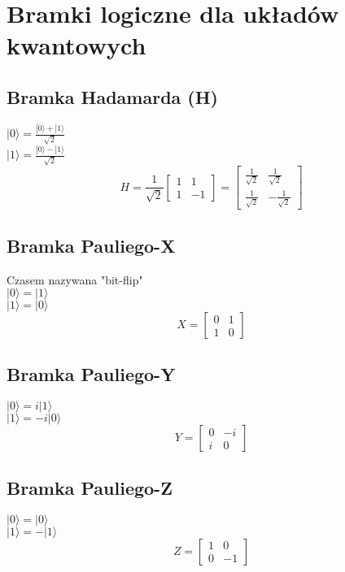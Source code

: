 \documentclass[12pt]{article}
\begin{document}
\newpage

\section{Bramki logiczne dla układów kwantowych}

\subsection{Bramka Hadamarda (H)}
$|0\rangle = \frac{|0\rangle + |1\rangle}{\sqrt{2}}$ \\
$|1\rangle = \frac{|0\rangle - |1\rangle}{\sqrt{2}}$
\[H = \frac{1}{\sqrt{2}}
\begin{bmatrix}
    1 & 1 \\
    1 & -1
\end{bmatrix}
=
\begin{bmatrix}
    \frac{1}{\sqrt{2}} & \frac{1}{\sqrt{2}} \\
    \frac{1}{\sqrt{2}} & -\frac{1}{\sqrt{2}}
\end{bmatrix}
\]

\subsection{Bramka Pauliego-X}
Czasem nazywana "bit-flip" \\
$|0\rangle = |1\rangle$ \\
$|1\rangle = |0\rangle$
\[X =
\begin{bmatrix}
    0 & 1 \\
    1 & 0
\end{bmatrix}
\]

\subsection{Bramka Pauliego-Y}
$|0\rangle = i|1\rangle$ \\
$|1\rangle = -i|0\rangle$
\[Y =
\begin{bmatrix}
    0 & -i \\
    i & 0
\end{bmatrix}
\]

\subsection{Bramka Pauliego-Z}
$|0\rangle = |0\rangle$ \\
$|1\rangle = -|1\rangle$
\[Z =
\begin{bmatrix}
    1 & 0 \\
    0 & -1
\end{bmatrix}
\]
\end{document}
